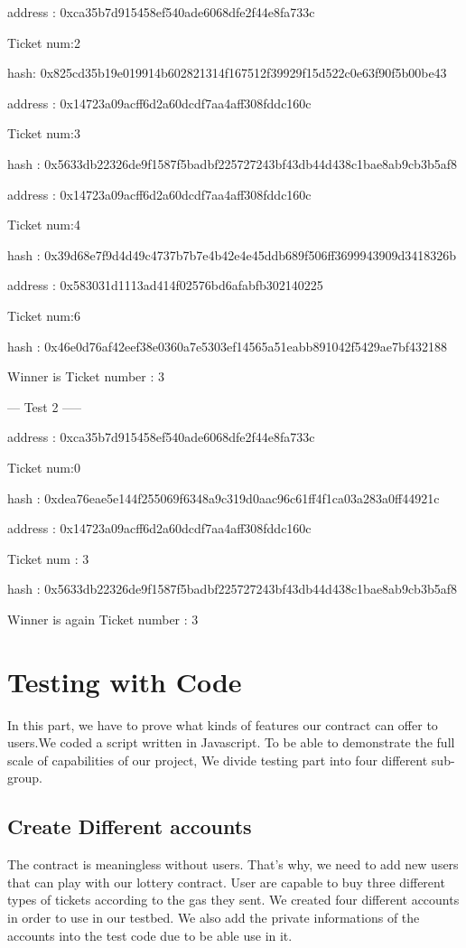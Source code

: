 \documentclass[]{scrreprt}
\begin{document}
		address : 0xca35b7d915458ef540ade6068dfe2f44e8fa733c
		
		Ticket num:2 
		
		hash: 0x825cd35b19e019914b602821314f167512f39929f15d522c0e63f90f5b00be43

		address : 0x14723a09acff6d2a60dcdf7aa4aff308fddc160c
		
		Ticket num:3 
		
		hash : 0x5633db22326de9f1587f5badbf225727243bf43db44d438c1bae8ab9cb3b5af8

		address : 0x14723a09acff6d2a60dcdf7aa4aff308fddc160c
		
		Ticket num:4 
		
		hash : 0x39d68e7f9d4d49c4737b7b7e4b42e4e45ddb689f506ff3699943909d3418326b

		address : 0x583031d1113ad414f02576bd6afabfb302140225
		
		Ticket num:6 
		
		hash : 0x46e0d76af42eef38e0360a7e5303ef14565a51eabb891042f5429ae7bf432188

		Winner is Ticket number : 3

		--- Test 2 -----

		address : 0xca35b7d915458ef540ade6068dfe2f44e8fa733c
		
		Ticket num:0 
		
		hash : 0xdea76eae5e144f255069f6348a9c319d0aac96c61ff4f1ca03a283a0ff44921c

		address : 0x14723a09acff6d2a60dcdf7aa4aff308fddc160c
		
		Ticket num : 3
		
		hash : 0x5633db22326de9f1587f5badbf225727243bf43db44d438c1bae8ab9cb3b5af8

		Winner is again Ticket number : 3
		\section{Testing with Code}
		 In this part, we have to prove what kinds of features our contract can offer to users.We coded a script written in Javascript\cite{JavaScript}.  To be able to demonstrate the full scale of capabilities of our project, We divide testing part into four different sub-group.
		  \subsection{Create Different accounts}
			The contract is meaningless without users. That's why, we need to add new users that can play with our lottery contract. User are capable to buy three different types of tickets according to the gas they sent. We created four different accounts in order to use in our testbed. We also add the private informations of the accounts into the test code due to be able use in it.
\end{document}
